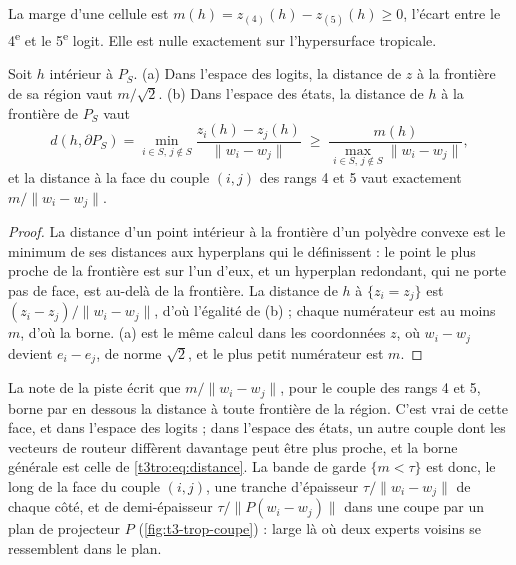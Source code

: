 \begin{definition}[Marge]\label{t3tro:def:marge}
La marge d'une cellule est $m(h) = z_{(4)}(h) - z_{(5)}(h) \ge 0$, l'écart entre le 4\textsuperscript{e} et le 5\textsuperscript{e} logit. Elle est nulle exactement sur l'hypersurface tropicale.
\end{definition}

\begin{proposition}\label{t3tro:prop:distance}
Soit $h$ intérieur à $P_S$. (a) Dans l'espace des logits, la distance de $z$ à la frontière de sa région vaut $m/\sqrt 2$. (b) Dans l'espace des états, la distance de $h$ à la frontière de $P_S$ vaut
\begin{equation}\label{t3tro:eq:distance}
d(h, \partial P_S) = \min_{i \in S,\, j \notin S} \frac{z_i(h) - z_j(h)}{\lVert w_i - w_j \rVert} \;\ge\; \frac{m(h)}{\max_{i \in S,\, j\notin S} \lVert w_i - w_j\rVert},
\end{equation}
et la distance à la face du couple $(i, j)$ des rangs 4 et 5 vaut exactement $m/\lVert w_i - w_j \rVert$.
\end{proposition}
\begin{proof}
La distance d'un point intérieur à la frontière d'un polyèdre convexe est le minimum de ses distances aux hyperplans qui le définissent : le point le plus proche de la frontière est sur l'un d'eux, et un hyperplan redondant, qui ne porte pas de face, est au-delà de la frontière. La distance de $h$ à $\{z_i = z_j\}$ est $(z_i - z_j)/\lVert w_i - w_j\rVert$, d'où l'égalité de (b) ; chaque numérateur est au moins $m$, d'où la borne. (a) est le même calcul dans les coordonnées $z$, où $w_i - w_j$ devient $e_i - e_j$, de norme $\sqrt 2$, et le plus petit numérateur est $m$.
\end{proof}
La note de la piste écrit que $m/\lVert w_i - w_j\rVert$, pour le couple des rangs 4 et 5, borne par en dessous la distance à toute frontière de la région. C'est vrai de cette face, et dans l'espace des logits ; dans l'espace des états, un autre couple dont les vecteurs de routeur diffèrent davantage peut être plus proche, et la borne générale est celle de \eqref{t3tro:eq:distance}. La bande de garde $\{m < \tau\}$ est donc, le long de la face du couple $(i, j)$, une tranche d'épaisseur $\tau/\lVert w_i - w_j\rVert$ de chaque côté, et de demi-épaisseur $\tau/\lVert P(w_i - w_j)\rVert$ dans une coupe par un plan de projecteur $P$ (\cref{fig:t3-trop-coupe}) : large là où deux experts voisins se ressemblent dans le plan.

